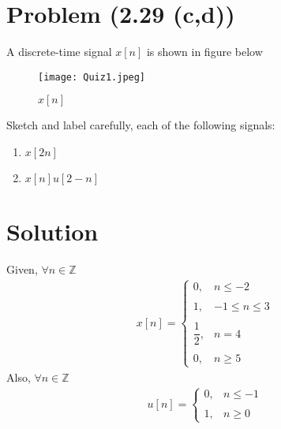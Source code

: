 \documentclass[journal,12pt,twocolumn]{IEEEtran}
\begin{document}
\section{Problem (2.29 (c,d))}
A discrete-time signal $x[n]$ is shown in figure below
\begin{figure}[!h]
 \centering
 \texttt{[image: Quiz1.jpeg]}
 \caption{$x[n]$}
 \label{plot}
\end{figure}


Sketch and label carefully, each of the following signals:
\begin{enumerate}
    \item $x[2n]$
    \item $x[n]u[2-n]$
\end{enumerate}
\section{Solution}
Given, $\forall n \in \mathbb{Z}$
\begin{align}
    x[n]=\begin{cases}
	0, & n \leq -2 \\~\\[-1em]
	1, & -1 \leq n \leq 3 \\~\\[-1em]
	\dfrac{1}{2}, & n=4 \\~\\[-1em]
	0, & n \geq 5 
	\end{cases}
	\label{eq:x}
\end{align}
Also, $\forall n \in \mathbb{Z}$
\begin{align}
    u[n]=\begin{cases}
	0, & n \leq -1 \\~\\[-1em]
	1, & n \geq 0 
	\end{cases}
	\label{eq:u}
\end{align}
\end{document}
